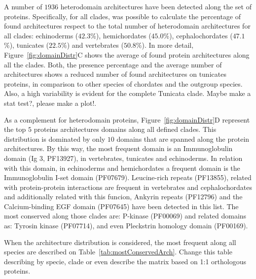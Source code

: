 \documentclass[11pt]{article}
\newcommand{\TODO}[1]{\begingroup\color{red}#1\endgroup}
\begin{document}
A number of $1936$ heterodomain architectures have been detected along the set 
of proteins. Specifically, for all clades, was possible to calculate 
the percentage of found architectures respect to the total number of 
heterodomain architectures for all clades: echinoderms ($42.3$\%), 
hemichordates ($45.0$\%), cephalochordates ($47.1$\%), tunicates 
($22.5$\%) and vertebrates ($50.8$\%). In more detail, 
Figure~\ref{fig:domainDistr}C shows the average of found protein architectures 
along all the clades. Both, the presence percentage and the average number of 
architectures shows a reduced number of found architectures on tunicates 
proteins, in comparison to other species of chordates and the outgroup species. 
Also, a high variability is evident for the complete Tunicata clade. \TODO{Maybe 
make a stat test?, please make a plot!}.  

As a complement for heterodomain proteins, Figure~\ref{fig:domainDistr}D 
represent the top $5$ proteins architectures domains along all defined clades. 
This distribution is dominated by only $10$ domains that are spanned along 
the protein architectures. By this way, the most frequent domain is an 
Immunoglobulin domain (Ig 3, PF13927), in vertebrates, tunicates and 
echinoderms. In relation with this domain, in echinoderms and hemichordates a 
frequent domain is the Immunoglobulin I-set domain (PF07679). Leucine-rich 
repeats (PF13855), related with protein-protein interactions are frequent in 
vertebrates and cephalochordates and additionally related with this funcion, 
Ankyrin repeats (PF12796) and the Calcium-binding EGF domain (PF07645) have 
been detected in this list. The most conserved along those clades are: P-kinase 
(PF00069) and related domains as: Tyrosin kinase (PF07714), and even Pleckstrin 
homology domain (PF00169). 

\TODO{When the architecture distribution is considered, the most frequent along 
all species are described on Table~\ref{tab:mostConservedArch}. Change 
this table describing by specie, clade or even describe the matrix based on 1:1 
orthologous proteins.}
\end{document}
